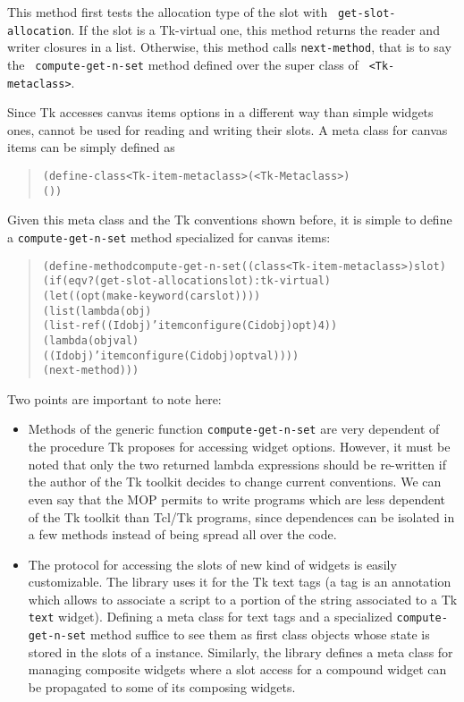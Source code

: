 {\noindent
This method first tests the allocation type of the slot with {\tt
get-slot-allocation}. If the slot is a Tk-virtual one, this method
returns the reader and writer closures in a list. Otherwise, this
method calls {\tt next-method}, that is to say the {\tt
compute-get-n-set} method defined over the super class of {\tt
<Tk-metaclass>}.

Since Tk accesses canvas items options in a different way than simple
widgets ones, {\tt <Tk-metaclass>} cannot be used for reading and
writing their slots. A meta class for canvas items can be simply
defined as
\begin{quote}\figsize
\begin{alltt}
(define-class <Tk-item-metaclass> (<Tk-Metaclass>)
  ())
\end{alltt}
\end{quote}
\noindent
Given this meta class and the Tk conventions shown before, it is simple to
define a {\tt compute-get-n-set} method specialized for canvas items:
\begin{quote}\figsize
\begin{alltt}
(define-method compute-get-n-set ((class <Tk-item-metaclass>) slot)
  (if (eqv? (get-slot-allocation slot) :tk-virtual)
      (let ((opt (make-keyword (car slot))))
        (list (lambda (obj)   
                (list-ref ((Id obj) 'itemconfigure (Cid obj) opt) 4))
              (lambda (obj val) 
                ((Id obj) 'itemconfigure (Cid obj) opt val))))
      (next-method)))
\end{alltt}
\end{quote}

\noindent
Two points are important to note here:
\begin{itemize}
\item  Methods of the generic function {\tt compute-get-n-set} are 
very dependent of the procedure Tk proposes for accessing widget
options. However, it must be noted that only the two returned lambda
expressions should be re-written if the author of the Tk toolkit
decides to change current conventions. We can even say that the MOP
permits to write programs which are less dependent of the Tk toolkit
than Tcl/Tk programs, since dependences can be isolated in a few
methods instead of being spread all over the code.
\item The protocol for accessing the slots of new kind of widgets is
easily customizable. The {\stklos} library uses it for the Tk text tags (a
tag is an annotation which allows to associate a script to a portion of the
string associated to a Tk {\tt text} widget). Defining a meta class for
text tags and a specialized {\tt compute-get-n-set} method suffice to see
them as first class objects whose state is stored in the slots of a
{\stklos} instance. Similarly, the {\stklos} library defines a meta class
for managing composite widgets where a slot access for a compound widget
can be propagated to some of its composing widgets.
\end{itemize}

}
